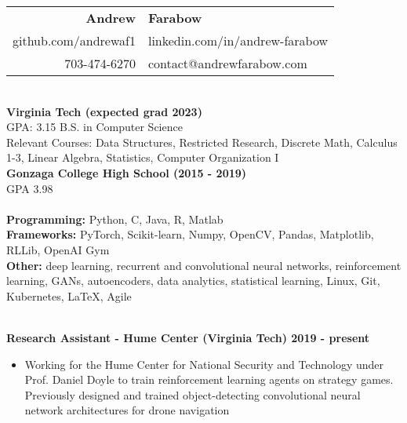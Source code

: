 \documentclass{article}
\begin{document}
  \begin{center}
    \begin{tabular}{r l}
      {\huge\textbf{Andrew}} & {\huge\textbf{Farabow}} \\
      \hspace{35pt} github.com/andrewaf1 & linkedin.com/in/andrew-farabow \\
      703-474-6270 & contact@andrewfarabow.com \\
    \end{tabular}


  \begin{flushleft}
    \begin{multicols}{2}
      {\large\textbf{\underline{}}} \\
      \textbf{Virginia Tech (expected grad 2023)} \\
      GPA: 3.15 \quad B.S. in Computer Science \\
      Relevant Courses: Data Structures, Restricted Research, Discrete Math, Calculus 1-3, Linear Algebra, Statistics, Computer Organization I\\
      \textbf{Gonzaga College High School	(2015 - 2019)} \\
      GPA 3.98 \\
     

    \columnbreak
    {\large\textbf{\underline{}}} \\
    {\textbf{Programming:}} Python, C, Java, R, Matlab \\
    {\textbf{Frameworks:}} PyTorch, Scikit-learn, Numpy, OpenCV, Pandas, Matplotlib, RLLib, OpenAI Gym \\
    {\textbf{Other:}} deep learning, recurrent and convolutional neural networks, reinforcement learning, GANs, autoencoders, data analytics, statistical learning, Linux, Git, Kubernetes, LaTeX, Agile \\

    \end{multicols}

    {\large\textbf{\underline{}}} \\
    
    \textbf{Research Assistant - Hume Center (Virginia Tech) \hfill 2019 - present}
    \begin{itemize}
      \itemsep0em
      \item Working for the Hume Center for National Security and Technology under Prof. Daniel Doyle to train reinforcement learning agents on strategy games. Previously designed and trained object-detecting convolutional neural network architectures for drone navigation
    \end{itemize}


\end{flushleft}
\end{center}
\end{document}
